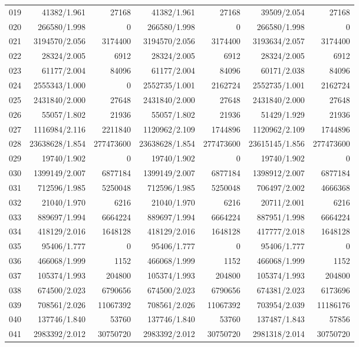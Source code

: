 \begin{longtable}{crrrrrr}
019 & 41382/1.961 & 27168 & 41382/1.961 & 27168 & 39509/2.054 & 27168 \\
020 & 266580/1.998 & 0 & 266580/1.998 & 0 & 266580/1.998 & 0 \\
021 & 3194570/2.056 & 3174400 & 3194570/2.056 & 3174400 & 3193634/2.057 & 3174400 \\
022 & 28324/2.005 & 6912 & 28324/2.005 & 6912 & 28324/2.005 & 6912 \\
023 & 61177/2.004 & 84096 & 61177/2.004 & 84096 & 60171/2.038 & 84096 \\
024 & 2555343/1.000 & 0 & 2552735/1.001 & 2162724 & 2552735/1.001 & 2162724 \\
025 & 2431840/2.000 & 27648 & 2431840/2.000 & 27648 & 2431840/2.000 & 27648 \\
026 & 55057/1.802 & 21936 & 55057/1.802 & 21936 & 51429/1.929 & 21936 \\
027 & 1116984/2.116 & 2211840 & 1120962/2.109 & 1744896 & 1120962/2.109 & 1744896 \\
028 & 23638628/1.854 & 277473600 & 23638628/1.854 & 277473600 & 23615145/1.856 & 277473600 \\
029 & 19740/1.902 & 0 & 19740/1.902 & 0 & 19740/1.902 & 0 \\
030 & 1399149/2.007 & 6877184 & 1399149/2.007 & 6877184 & 1398912/2.007 & 6877184 \\
031 & 712596/1.985 & 5250048 & 712596/1.985 & 5250048 & 706497/2.002 & 4666368 \\
032 & 21040/1.970 & 6216 & 21040/1.970 & 6216 & 20711/2.001 & 6216 \\
033 & 889697/1.994 & 6664224 & 889697/1.994 & 6664224 & 887951/1.998 & 6664224 \\
034 & 418129/2.016 & 1648128 & 418129/2.016 & 1648128 & 417777/2.018 & 1648128 \\
035 & 95406/1.777 & 0 & 95406/1.777 & 0 & 95406/1.777 & 0 \\
036 & 466068/1.999 & 1152 & 466068/1.999 & 1152 & 466068/1.999 & 1152 \\
037 & 105374/1.993 & 204800 & 105374/1.993 & 204800 & 105374/1.993 & 204800 \\
038 & 674500/2.023 & 6790656 & 674500/2.023 & 6790656 & 674381/2.023 & 6173696 \\
039 & 708561/2.026 & 11067392 & 708561/2.026 & 11067392 & 703954/2.039 & 11186176 \\
040 & 137746/1.840 & 53760 & 137746/1.840 & 53760 & 137487/1.843 & 57856 \\
041 & 2983392/2.012 & 30750720 & 2983392/2.012 & 30750720 & 2981318/2.014 & 30750720 \\

\end{longtable}
